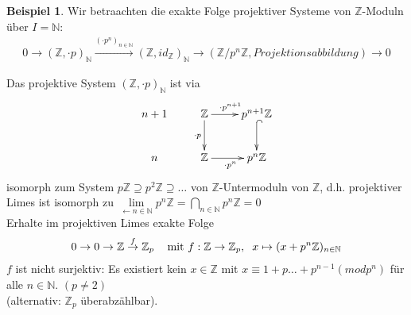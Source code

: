 \documentclass[10pt,a4paper,numbers=endperiod]{scrreprt}
\theoremstyle{definition}
\newtheorem{bsp}[satz]{Beispiel}
\def\NN{{\mathbb N}}
\def\ZZ{{\mathbb Z}}
\begin{document}
\begin{bsp}
	Wir betraachten die exakte Folge projektiver Systeme von $\ZZ$-Moduln über $I = \NN$: \begin{align*}
	0 \longrightarrow (\ZZ, \cdot p)_\NN \overset{{(\cdot p^n)_{n \in \NN}}}{\longrightarrow} (\ZZ, id_\ZZ)_\NN \longrightarrow (\ZZ/p^n\ZZ, Projektionsabbildung) \longrightarrow 0
	\end{align*}
	
	Das projektive System $(\ZZ, \cdot p)_\NN$ ist via \begin{align*}
	\begin{xy}
		\xymatrix{
			n+1 & \ZZ \ar[r]^{\cdot p^{n+1}} \ar[d]_{\cdot p} & p^{n+1}\ZZ \ar@{^{(}->}[d]\\
			n & \ZZ \ar[r]_{\cdot p^n} & p^n\ZZ
		}
	\end{xy}
	\end{align*}
	isomorph zum System $p\ZZ \supseteq p^2\ZZ \supseteq \ldots$ von $\ZZ$-Untermoduln von $\ZZ$, d.h. projektiver Limes ist isomorph zu $\lim\limits_{\leftarrow n \in \NN} p^n\ZZ = \bigcap\limits_{n \in \NN} p^n \ZZ = 0$\\
	Erhalte im projektiven Limes exakte Folge \begin{align*}
		0 \to 0 \to \ZZ \overset{f}{\to} \ZZ_p \hspace*{3mm} \text{ mit } f: \ZZ \to \ZZ_p, \hspace*{2mm} x \mapsto (x + p^n\ZZ)_{n \in \NN}
	\end{align*}
	$f$ ist nicht surjektiv: Es existiert kein $x \in \ZZ$ mit $x \equiv 1 + p \ldots + p^{n-1} (mod p^n)$ für alle $n \in \NN$. $(p \neq 2)$\\
	(alternativ: $\ZZ_p$ überabzählbar). 
\end{bsp}
\end{document}
